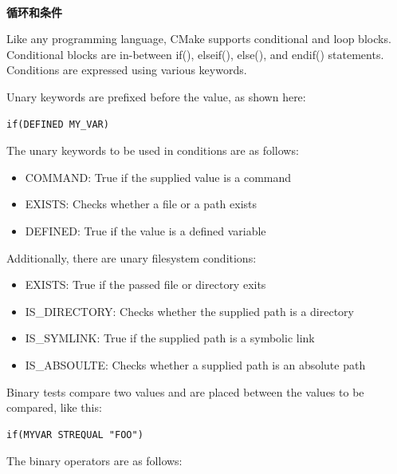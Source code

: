 \hspace*{\fill} \\ %
\noindent
\textbf{循环和条件}

Like any programming language, CMake supports conditional and loop blocks. Conditional blocks are in-between if(), elseif(), else(), and endif() statements. Conditions are expressed using various keywords.

Unary keywords are prefixed before the value, as shown here:

\begin{lstlisting}[style=styleCMake]
if(DEFINED MY_VAR)
\end{lstlisting}

The unary keywords to be used in conditions are as follows:

\begin{itemize}
\item 
COMMAND: True if the supplied value is a command

\item 
EXISTS: Checks whether a file or a path exists

\item 
DEFINED: True if the value is a defined variable
\end{itemize}

Additionally, there are unary filesystem conditions:

\begin{itemize}
\item 
EXISTS: True if the passed file or directory exits

\item 
IS\_DIRECTORY: Checks whether the supplied path is a directory

\item 
IS\_SYMLINK: True if the supplied path is a symbolic link

\item 
IS\_ABSOULTE: Checks whether a supplied path is an absolute path
\end{itemize}

Binary tests compare two values and are placed between the values to be compared, like this:

\begin{lstlisting}[style=styleCMake]
if(MYVAR STREQUAL "FOO")
\end{lstlisting}

The binary operators are as follows:

